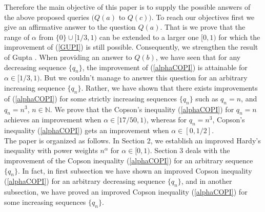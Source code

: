 \documentclass[12pt]{amsart}
\theoremstyle{definition}
\theoremstyle{plain}
\theoremstyle{definition}
\numberwithin{equation}{section}
\begin{document}
Therefore the main objective of this paper is to supply the possible answers of the above proposed queries $(Q(a)$ to $Q(c))$. To reach our objectives first we give an affirmative answer to the question $Q(a)$. That is we prove that the range of $\alpha$ from $\{0\}\cup[1/3, 1)$ can be extended to a larger one $[0, 1)$ for which the improvement of (\ref{GUPI}) is still possible. Consequently, we strengthen the result of Gupta \cite{SGA}. When providing an answer to $Q(b)$, we have seen that for any decreasing sequence $\{q_n\}$, the improvement of (\ref{alphaCOPI}) is attainable for $\alpha\in [1/3, 1)$. But we couldn't manage to answer this question for an arbitrary increasing sequence $\{q_n\}$. Rather, we have shown that there exists improvements of (\ref{alphaCOPI}) for some strictly increasing sequences $\{q_n\}$ such as $q_n=n$, and $q_n=n^3$, $n\in \mathbb{N}$. We prove that the Copson's inequality (\ref{alphaCOPI}) for $q_n=n$ achieves an improvement when $\alpha\in [17/50, 1)$, whereas for $q_n=n^3$, Copson's inequality (\ref{alphaCOPI}) gets an improvement when $\alpha\in [0, 1/2]$.\\
The paper is organized as follows. In Section 2, we establish an improved Hardy's inequality with power weights $n^\alpha$ for $\alpha\in [0, 1)$. Section 3 deals with the improvement of the Copson inequality (\ref{alphaCOPI}) for an arbitrary sequence $\{q_n\}$. In fact, in first subsection we have shown an improved Copson inequality (\ref{alphaCOPI}) for an arbitrary decreasing sequence $\{q_n\}$, and in another subsection, we have proved an improved Copson inequality (\ref{alphaCOPI}) for some increasing sequences $\{q_n\}$.
\end{document}
